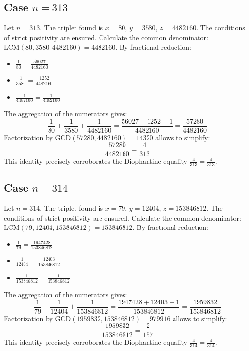 \documentclass[11pt,a4paper]{article}
\begin{document}
\subsection{Case $n = 313$}
Let $n = 313$. The triplet found is $x = 80$, $y = 3580$, $z = 4482160$.
The conditions of strict positivity are ensured.
Calculate the common denominator: $\text{LCM}(80, 3580, 4482160) = 4482160$.
By fractional reduction:
\begin{itemize}
    \item $\frac{1}{80} = \frac{56027}{4482160}$
    \item $\frac{1}{3580} = \frac{1252}{4482160}$
    \item $\frac{1}{4482160} = \frac{1}{4482160}$
\end{itemize}
The aggregation of the numerators gives:
$$ \frac{1}{80} + \frac{1}{3580} + \frac{1}{4482160} = \frac{56027 + 1252 + 1}{4482160} = \frac{57280}{4482160} $$
Factorization by $\text{GCD}(57280, 4482160) = 14320$ allows to simplify:
$$ \frac{57280}{4482160} = \frac{4}{313} $$
This identity precisely corroborates the Diophantine equality $\frac{4}{313} = \frac{4}{313}$.

\subsection{Case $n = 314$}
Let $n = 314$. The triplet found is $x = 79$, $y = 12404$, $z = 153846812$.
The conditions of strict positivity are ensured.
Calculate the common denominator: $\text{LCM}(79, 12404, 153846812) = 153846812$.
By fractional reduction:
\begin{itemize}
    \item $\frac{1}{79} = \frac{1947428}{153846812}$
    \item $\frac{1}{12404} = \frac{12403}{153846812}$
    \item $\frac{1}{153846812} = \frac{1}{153846812}$
\end{itemize}
The aggregation of the numerators gives:
$$ \frac{1}{79} + \frac{1}{12404} + \frac{1}{153846812} = \frac{1947428 + 12403 + 1}{153846812} = \frac{1959832}{153846812} $$
Factorization by $\text{GCD}(1959832, 153846812) = 979916$ allows to simplify:
$$ \frac{1959832}{153846812} = \frac{2}{157} $$
This identity precisely corroborates the Diophantine equality $\frac{4}{314} = \frac{4}{314}$.
\end{document}
